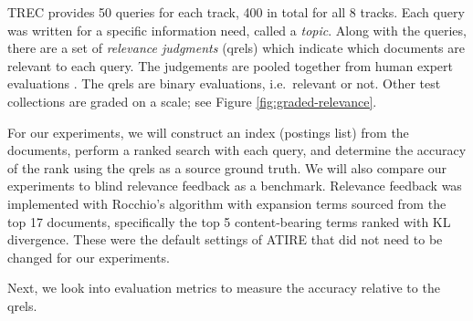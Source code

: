 
TREC provides 50 queries for each track, 400 in total for all 8 tracks. Each query was written for a specific information need, called a \textit{topic}. Along with the queries, there are a set of \textit{relevance judgments} (qrels) which indicate which documents are relevant to each query. The judgements are pooled together from human expert evaluations \cite{voorhees2005trec}. The qrels are binary evaluations, i.e.\ relevant or not. Other test collections are graded on a scale; see Figure \ref{fig:graded-relevance}.


For our experiments, we will construct an index (postings list) from the documents, perform a ranked search with each query, and determine the accuracy of the rank using the qrels as a source ground truth. We will also compare our experiments to blind relevance feedback as a benchmark. Relevance feedback was implemented with Rocchio's algorithm with expansion terms sourced from the top 17 documents, specifically the top 5 content-bearing terms ranked with KL divergence. These were the default settings of ATIRE that did not need to be changed for our experiments.

Next, we look into evaluation metrics to measure the accuracy relative to the qrels.

